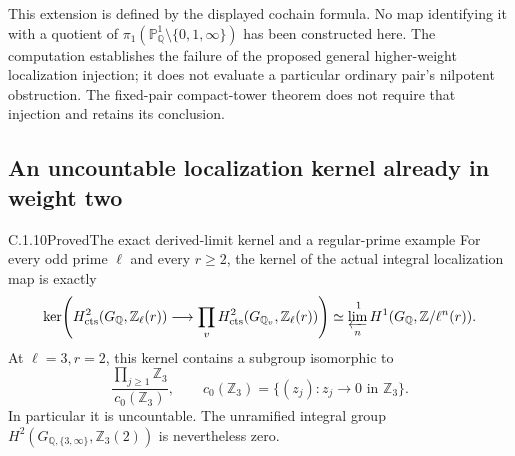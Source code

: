This extension is defined by the displayed cochain formula.
No map identifying it with a quotient of
\(\pi_1(\mathbb P^1_{\mathbb Q}\setminus\{0,1,\infty\})\)
has been constructed here. The computation establishes the
failure of the proposed general higher-weight localization
injection; it does not evaluate a particular ordinary pair's
nilpotent obstruction. The fixed-pair compact-tower theorem
does not require that injection and retains its conclusion.

\subsection{An uncountable localization kernel already in weight two}
\label{sec:ghost-uncountable-kernel}

\begin{result}{C.1.10}{Proved}{The exact derived-limit kernel and a regular-prime example}
\label{prop:ghost-uncountable-kernel}
For every odd prime \(\ell\) and every \(r\geq2\), the
kernel of the actual integral localization map is exactly
\[
 \ker\!\left(H^2_{\rm cts}(G_{\mathbb Q},\mathbb Z_\ell(r))
       \longrightarrow\prod_v H^2_{\rm cts}
                   (G_{\mathbb Q_v},\mathbb Z_\ell(r))\right)
 \simeq\varprojlim_n^{\,1}H^1
                (G_{\mathbb Q},\mathbb Z/\ell^n(r)).
\]
At \(\ell=3,r=2\), this kernel contains a subgroup isomorphic
to
\[
 \frac{\prod_{j\geq1}\mathbb Z_3}
      {c_0(\mathbb Z_3)},\qquad
 c_0(\mathbb Z_3)=
 \{(z_j):z_j\longrightarrow0\text{ in }\mathbb Z_3\}.
\]
In particular it is uncountable. The unramified integral group
\(H^2(G_{\mathbb Q,\{3,\infty\}},\mathbb Z_3(2))\)
is nevertheless zero.
\end{result}
